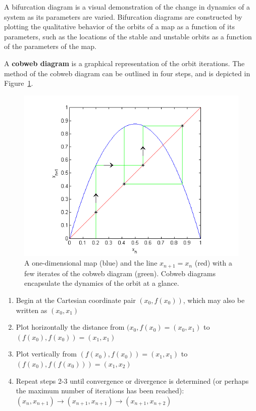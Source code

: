 A bifurcation diagram is a
visual demonstration of the change in dynamics of a system as its
parameters are varied. Bifurcation diagrams are constructed by
plotting the qualitative behavior of the orbits of a map as a function of its
parameters, such as the locations of the stable and unstable orbits as
a function of the parameters of the map. 

A \textbf{cobweb diagram} is a graphical representation of the orbit
iterations. The method of the cobweb diagram can be outlined in four
steps, and is depicted in Figure~\ref{fig:cobex}.
\begin{figure}[!h]
\caption[Example of a Cobweb Diagram]{A one-dimensional map (blue) and
  the line $x_{n+1}=x_n$ (red) with a few iterates of the cobweb
  diagram (green). Cobweb diagrams encapsulate the dynamics of the orbit at a glance.}\label{fig:cobex}
    \begin{center}
	\includegraphics[scale=0.8]{figs/cobweb_ex.png}
    \end{center}
\end{figure}

\begin{enumerate}
\item Begin at the Cartesian coordinate pair $(x_0, f(x_0))$, which
  may also be written as $(x_0, x_1)$
\item Plot horizontally the distance from $(x_0, f(x_0)=(x_0, x_1)$ to $(f(x_0),
  f(x_0))=(x_1, x_1)$
\item Plot vertically from $(f(x_0), f(x_0))=(x_1, x_1)$ to $(f(x_0), f(f(x_0)))=(x_1, x_2)$
\item Repeat steps 2-3 until convergence or divergence is determined
  (or perhaps the maximum number of iterations has been reached):
  $(x_n, x_{n+1}) \to (x_{n+1}, x_{n+1}) \to (x_{n+1},x_{n+2})$
\end{enumerate}

